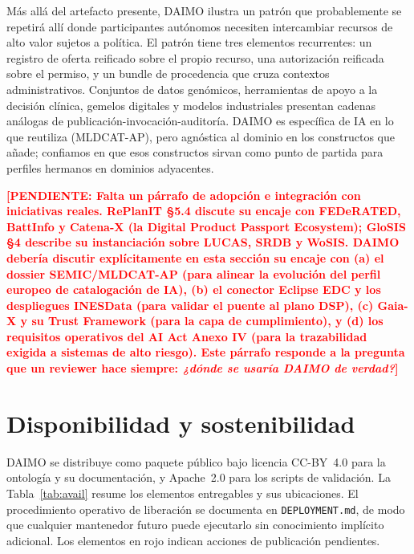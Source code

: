 \documentclass[11pt,a4paper]{article}
\newcommand{\code}[1]{\texttt{#1}}
\newcommand{\TODO}[1]{\textcolor{red}{\textbf{[PENDIENTE: #1]}}}
\begin{document}
Más allá del artefacto presente, DAIMO ilustra un patrón que probablemente se repetirá allí donde participantes autónomos necesiten intercambiar recursos de alto valor sujetos a política. El patrón tiene tres elementos recurrentes: un registro de oferta reificado sobre el propio recurso, una autorización reificada sobre el permiso, y un bundle de procedencia que cruza contextos administrativos. Conjuntos de datos genómicos, herramientas de apoyo a la decisión clínica, gemelos digitales y modelos industriales presentan cadenas análogas de publicación-invocación-auditoría. DAIMO es específica de IA en lo que reutiliza (MLDCAT-AP), pero agnóstica al dominio en los constructos que añade; confiamos en que esos constructos sirvan como punto de partida para perfiles hermanos en dominios adyacentes.

\TODO{Falta un párrafo de adopción e integración con iniciativas reales. RePlanIT §5.4 discute su encaje con FEDeRATED, BattInfo y Catena-X (la Digital Product Passport Ecosystem); GloSIS §4 describe su instanciación sobre LUCAS, SRDB y WoSIS. DAIMO debería discutir explícitamente en esta sección su encaje con (a) el dossier SEMIC/MLDCAT-AP (para alinear la evolución del perfil europeo de catalogación de IA), (b) el conector Eclipse EDC y los despliegues INESData (para validar el puente al plano DSP), (c) Gaia-X y su Trust Framework (para la capa de cumplimiento), y (d) los requisitos operativos del AI Act Anexo IV (para la trazabilidad exigida a sistemas de alto riesgo). Este párrafo responde a la pregunta que un reviewer hace siempre: \emph{¿dónde se usaría DAIMO de verdad?}}

\section{Disponibilidad y sostenibilidad}\label{sec:avail}

DAIMO se distribuye como paquete público bajo licencia CC-BY~4.0 para la ontología y su documentación, y Apache~2.0 para los scripts de validación. La Tabla~\ref{tab:avail} resume los elementos entregables y sus ubicaciones. El procedimiento operativo de liberación se documenta en \code{DEPLOYMENT.md}, de modo que cualquier mantenedor futuro puede ejecutarlo sin conocimiento implícito adicional. Los elementos en rojo indican acciones de publicación pendientes.
\end{document}
